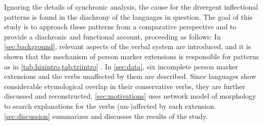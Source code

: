 Ignoring the details of synchronic analysis, the cause for the divergent inflectional patterns is found in the diachrony of the languages in question.
The goal of this study is to approach these patterns from a comparative perspective and to provide a diachronic and functional account, proceeding as follows:
In \cref{sec:background}, relevant aspects of the \PC verbal system are introduced, and it is shown that the mechanism of person marker extensions is responsible for patterns as in \cref{tab:hixintro,tab:triintro} .
In \cref{sec:data}, six incomplete person marker extensions and the verbs unaffected by them are described.
Since languages show considerable etymological overlap in their conservative verbs, they are further discussed and reconstructed.
\cref{sec:motivations} uses  network model of morphology to search explanations for the verbs (un-)affected by each extension.
\cref{sec:discussion} summarizes and discusses the results of the study.

